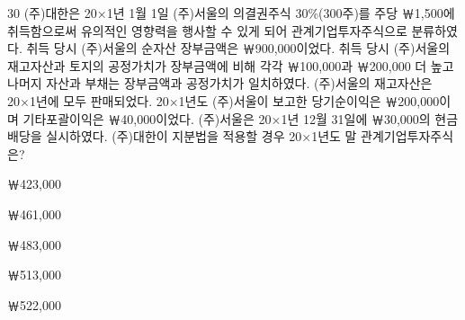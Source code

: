 \begin{question}{30}
(주)대한은 20×1년 1월 1일 (주)서울의 의결권주식 30\%(300주)를 주당 ￦1,500에 취득함으로써 유의적인 영향력을 행사할 수 있게 되어 관계기업투자주식으로 분류하였다. 취득 당시 (주)서울의 순자산 장부금액은 ￦900,000이었다. 취득 당시 (주)서울의 재고자산과 토지의 공정가치가 장부금액에 비해 각각 ￦100,000과 ￦200,000 더 높고 나머지 자산과 부채는 장부금액과 공정가치가 일치하였다. (주)서울의 재고자산은 20×1년에 모두 판매되었다. 20×1년도 (주)서울이 보고한 당기순이익은 ￦200,000이며 기타포괄이익은 ￦40,000이었다. (주)서울은 20×1년 12월 31일에 ￦30,000의 현금배당을 실시하였다. (주)대한이 지분법을 적용할 경우 20×1년도 말 관계기업투자주식은?
\begin{choices}
  \item ￦423,000
  \item ￦461,000
  \item ￦483,000
  \item ￦513,000
  \item ￦522,000
\end{choices}
\end{question}
